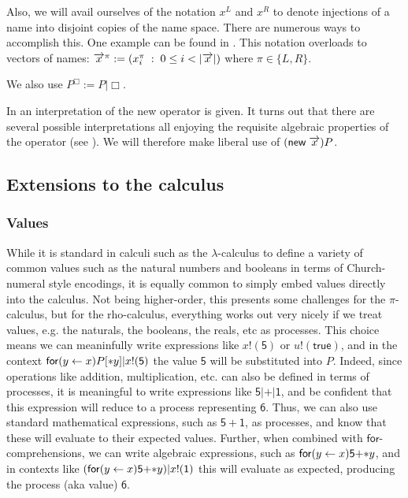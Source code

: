 Also, we will avail ourselves of the notation $x^{L}$ and $x^{R}$ to
denote injections of a name into disjoint copies of the name
space. There are numerous ways to accomplish this. One example can be
found in \cite{DBLP:journals/entcs/MeredithR05}. This notation overloads to vectors of
names: $\arrvec{x}^{\pi} := (x_{i}^{\pi} \; : \; 0 \leq i < |\arrvec{x}| )$ where $\pi \in \{L,R\}$.

We also use $P^{\Box} := P|\Box$.

In \cite{DBLP:journals/entcs/MeredithR05} an interpretation of the new operator is
given. It turns out that there are several possible interpretations
all enjoying the requisite algebraic properties of the operator (see
\cite{milner91polyadicpi}). We will therefore make liberal use of
$(\mathsf{new}\; \arrvec{x})P$.

\subsection{Extensions to the calculus}
\subsubsection{Values}
While it is standard in calculi such as the $\lambda$-calculus to
define a variety of common values such as the natural numbers and
booleans in terms of Church-numeral style encodings, it is equally
common to simply embed values directly into the calculus. Not being
higher-order, this presents some challenges for the $\pi$-calculus,
but for the rho-calculus, everything works out very nicely if we treat
values, e.g. the naturals, the booleans, the reals, etc as processes. This
choice means we can meaninfully write expressions like
$x!(\mathsf{5})$ or $u!(\mathsf{true})$, and in the context
$\prefix{x}{y}P[*y] \mathsf{|} x!(\mathsf{5})$ the value $\mathsf{5}$
will be substituted into $P$. Indeed, since operations like addition,
multiplication, etc.  can also be defined in terms of processes, it is
meaningful to write expressions like
$\mathsf{5}\mathsf{|}\mathsf{+}\mathsf{|}\mathsf{1}$, and be confident
that this expression will reduce to a process representing
$\mathsf{6}$. Thus, we can also use standard mathematical expressions,
such as $\mathsf{5+1}$, as processes, and know that these will
evaluate to their expected values. Further, when combined with
$\mathsf{for}$-comprehensions, we can write algebraic expressions,
such as $\prefix{x}{y}\mathsf{5}\mathsf{+}\mathsf{*}y$, and in
contexts like
$(\prefix{x}{y}\mathsf{5}\mathsf{+}\mathsf{*}y)\mathsf{|}\outputp{x}{\mathsf{1}}$
this will evaluate as expected, producing the process (aka value)
$\mathsf{6}$.

